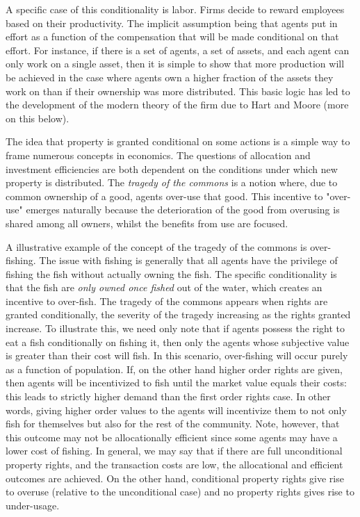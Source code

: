 A specific case of this conditionality is labor. Firms decide to reward employees based on their productivity. The implicit assumption being that agents put in effort as a function of the compensation that will be made conditional on that effort. For instance, if there is a set of agents, a set of assets, and each agent can only work on a single asset, then it is simple to show that more production will be achieved in the case where agents own a higher fraction of the assets they work on than if their ownership was more distributed. This basic logic has led to the development of the modern theory of the firm due to Hart and Moore (more on this below).

The idea that property is granted conditional on some actions is a simple way to frame numerous concepts in economics. The questions of allocation and investment efficiencies are both dependent on the conditions under which new property is distributed. The \textit{tragedy of the commons} is a notion where, due to common ownership of a good, agents over-use that good. This incentive to "over-use" emerges naturally because the deterioration of the good from overusing is shared among all owners, whilst the benefits from use are focused. 

A illustrative example of the concept of the tragedy of the commons is over-fishing. The issue with fishing is generally that all agents have the privilege of fishing the fish without actually owning the fish. The specific conditionality is that the fish are \textit{only owned once fished} out of the water, which creates an incentive to over-fish. The tragedy of the commons appears when rights are granted conditionally, the severity of the tragedy increasing as the rights granted increase. To illustrate this, we need only note that if agents possess the right to eat a fish conditionally on fishing it, then only the agents whose subjective value is greater than their cost will fish. In this scenario, over-fishing will occur purely as a function of population. If, on the other hand higher order rights are given, then agents will be incentivized to fish until the market value equals their costs: this leads to strictly higher demand than the first order rights case. In other words, giving higher order values to the agents will incentivize them to not only fish for themselves but also for the rest of the community. Note, however, that this outcome may not be allocationally efficient since some agents may have a lower cost of fishing. In general, we may say that if there are full unconditional property rights, and the transaction costs are low, the allocational and efficient outcomes are achieved. On the other hand, conditional property rights give rise to overuse (relative to the unconditional case) and no property rights gives rise to under-usage.

